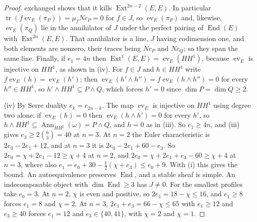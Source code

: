\documentclass[11pt,reqno]{amsart}
\theoremstyle{plain}
\theoremstyle{definition}
\theoremstyle{remark}
\DeclareMathOperator{\End}{End}
\DeclareMathOperator{\Ext}{Ext}
\DeclareMathOperator{\Ann}{Ann}
\begin{document}
\begin{proof}
exchanged shows that it kills $\Ext^{2n-2}(E,E)$. In particular
$\operatorname{tr}(f\operatorname{ev}_{E}(\pi_{P}))=\mu_{f}Nc_{P}=0$ for
$f\in J$, so $\operatorname{ev}_{E}(\pi_{P})$ and, likewise,
$\operatorname{ev}_{E}(\pi_{Q})$ lie in the annihilator of $J$ under the
perfect pairing of $\End(E)$ with $\Ext^{2n}(E,E)$. That annihilator is a
line, $J$ having codimension one, and both elements are nonzero, their traces
being $Nc_{P}$ and $Nc_{Q}$; so they span the same line. Finally, if
$e_{1}=4n$ then $\Ext^{1}(E,E)=\operatorname{ev}_{E}(HH^{1})$, because
$\operatorname{ev}_{E}$ is injective on $HH^{1}$, as shown in (iv). For
$f\in J$ and $h\in HH^{1}$ write $f\operatorname{ev}_{E}(h)=
\operatorname{ev}_{E}(h')$; then
$\operatorname{ev}_{E}(h'\wedge h'')=f\operatorname{ev}_{E}(h\wedge h'')=0$ for
every $h''\in HH^{1}$, so $h'\wedge HH^{1}\subseteq P\wedge Q$, which forces
$h'=0$ since $\dim P=\dim Q\ge2$.

(iv) By Serre duality $e_{k}=e_{2n-k}$. The map $\operatorname{ev}_{E}$ is
injective on $HH^{1}$ using degree two alone: if $\operatorname{ev}_{E}(h)=0$
then $\operatorname{ev}_{E}(h\wedge h')=0$ for every $h'$, so
$h\wedge HH^{1}\subseteq\Ann_{HH^{2}}(\omega)=P\wedge Q$, and $h=0$ as in
(iii). So $e_{1}\ge4n$, and (iii) gives
$e_{3}\ge2\binom{6}{3}=40$ at $n=3$. At $n=2$ the Euler
characteristic is $2e_{0}-2e_{1}+12$, and at $n=3$ it is
$2e_{0}-2e_{1}+60-e_{3}$. So $2e_{0}=\chi+2e_{1}-12\ge\chi+4$ at $n=2$, and
$2e_{0}=\chi+2e_{1}+e_{3}-60\ge\chi+4$ at $n=3$, where also
$e_{1}=e_{0}+30-\frac12(\chi+e_{3})\le e_{0}+9$. With (i) this gives the
bound. An autoequivalence preserves $\End$, and a stable sheaf is simple.
An indecomposable object with $\dim\End\ge3$ has $J\ne0$. For the smallest
profiles take $e_{0}=3$. At $n=2$, $\chi$ is even and positive, so
$2e_{1}=18-\chi\le16$, and $e_{1}\ge8$ forces $e_{1}=8$ and $\chi=2$. At
$n=3$, $2e_{1}+e_{3}=66-\chi\le65$ with $e_{1}\ge12$ and $e_{3}\ge40$
forces $e_{1}=12$ and $e_{3}\in\{40,41\}$, with $\chi=2$ and $\chi=1$.
\end{proof}
\end{document}
